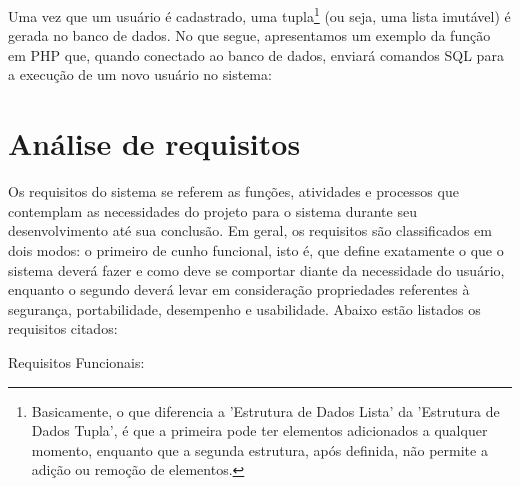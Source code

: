 Uma vez que um usuário é cadastrado, uma tupla\footnote{Basicamente, o que diferencia a 'Estrutura de Dados Lista' da 'Estrutura de Dados Tupla', é que a primeira pode ter elementos adicionados a qualquer momento, enquanto que a segunda estrutura, após definida, não permite a adição ou remoção de elementos.} (ou seja, uma lista imutável) é gerada no banco de dados. No que segue, apresentamos um exemplo da função em PHP que,  quando conectado ao banco de dados, enviará comandos SQL para a execução de um novo usuário no sistema:

\section{Análise de requisitos}
\label{sec:requisitos}
 
Os requisitos do sistema se referem as funções, atividades e processos que contemplam as necessidades do projeto para o sistema durante seu desenvolvimento até sua conclusão. Em geral, os requisitos são classificados em dois modos: o primeiro de cunho funcional, isto é, que define exatamente o que o sistema deverá fazer e como deve se comportar diante da necessidade do usuário, enquanto o segundo deverá levar em consideração propriedades referentes à segurança, portabilidade, desempenho e usabilidade. Abaixo estão listados os requisitos citados:

Requisitos Funcionais:

